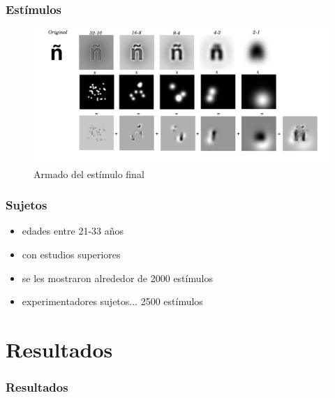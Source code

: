 \documentclass{beamer}
\begin{document}
\begin{frame}
\frametitle{Est\'imulos}
\begin{figure}
 \includegraphics[width=\textwidth]{graficos/estimulofinal.png}
\caption{Armado del est\'imulo final}
\end{figure}
\end{frame}

\begin{frame}
\frametitle{Sujetos}
\begin{itemize}
\item edades entre 21-33 años
\item con estudios superiores
\item se les mostraron alrededor de 2000 est\'imulos
\item experimentadores sujetos... 2500 est\'imulos
\end{itemize}
\end{frame}


\section{Resultados}
\begin{frame}
\frametitle{Resultados}
\end{frame}
\end{document}
